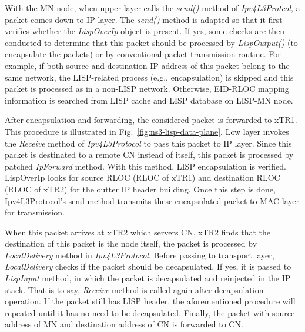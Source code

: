 With the MN node, when upper layer calls the \emph{send()} method of \emph{Ipv4L3Protcol}, a packet comes down to IP layer. The \emph{send()} method is adapted so that    
it first verifies whether the \emph{LispOverIp} object is present. If yes, some checks are then conducted to determine that this packet should be processed by \emph{LispOutput()} (to encapsulate the packets) or by conventional packet transmission routine. For example, if both source and destination IP address of this packet belong to the same network, the LISP-related process (e.g., encapsulation) is skipped and this packet is processed as in a non-LISP network. Otherwise, EID-RLOC mapping information is searched from LISP cache and LISP database on LISP-MN node. 

After encapsulation and forwarding, the considered packet is forwarded to xTR1. This procedure is illustrated in Fig.~\ref{fig:ns3-lisp-data-plane}. Low layer invokes the \emph{Receive} method of \emph{Ipv4L3Protocol} to pass this packet to IP layer. Since this packet is destinated to a remote CN instead of itself, this packet is processed by patched \emph{IpForward} method. %
With this method, LISP encapsulation is verified. LispOverIp looks for source RLOC (RLOC of xTR1) and destination RLOC (RLOC of xTR2) for the outter IP header building. Once this step is done, Ipv4L3Protocol's send method transmits these encapsulated packet to MAC layer for transmission.

When this packet arrives at xTR2 which servers CN, xTR2 finds that the destination of this packet is the node itself, the packet is processed by \emph{LocalDelivery} method in \emph{Ipv4L3Protocol}. Before passing to transport layer, \emph{LocalDelivery} checks if the packet should be decapsulated. If yes, it is passed to \emph{LispInput} method, in which the packet is decapsulated and reinjected in the IP stack. That is to say, \emph{Receive} method is called again after decapsulation operation. If the packet still has LISP header, the aforementioned procedure will repeated until it has no need to be decapsulated. Finally, the packet with source address of MN and destination address of CN is forwarded to CN.

